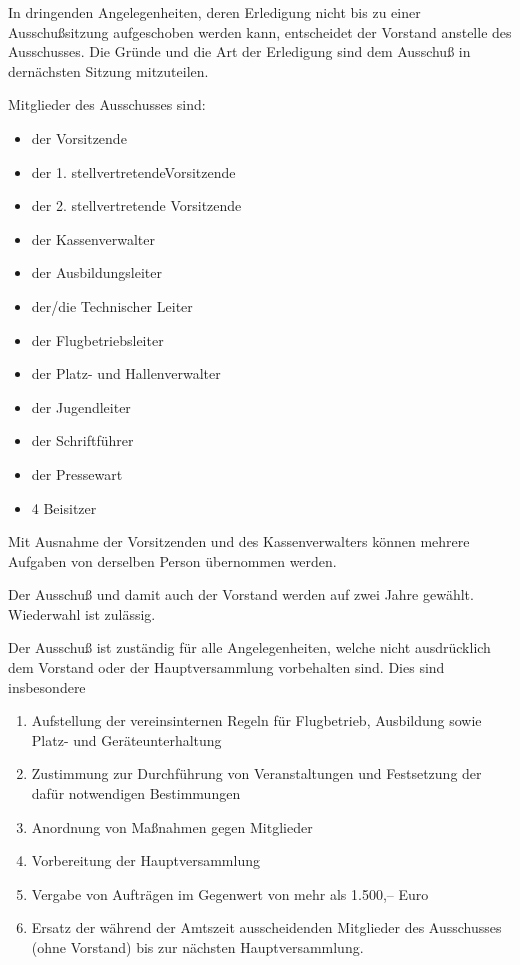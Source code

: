 \documentclass[10pt,a4paper,parskip=half]{scrartcl}
\begin{document}
\begin{contract}
\begin{multicols}{2}
    In dringenden Angelegenheiten,
    deren Erledigung nicht bis zu einer Ausschußsitzung aufgeschoben werden kann,
    entscheidet der Vorstand anstelle des Ausschusses.
    Die Gründe und die Art der Erledigung sind dem Ausschuß in dernächsten Sitzung mitzuteilen.
    
    Mitglieder des Ausschusses sind:
    \begin{itemize}[noitemsep]
      \item der Vorsitzende
      \item der 1. stellvertretendeVorsitzende
      \item der 2. stellvertretende Vorsitzende
      \item der Kassenverwalter
      \item der Ausbildungsleiter
      \item der/die Technischer Leiter
      \item der Flugbetriebsleiter
      \item der Platz- und Hallenverwalter
      \item der Jugendleiter
      \item der Schriftführer
      \item der Pressewart
      \item 4 Beisitzer
    \end{itemize}
    Mit Ausnahme der Vorsitzenden und des Kassenverwalters können mehrere Aufgaben von derselben Person übernommen werden.
    
    Der Ausschuß und damit auch der Vorstand werden auf zwei Jahre gewählt.
    Wiederwahl ist zulässig.
    
    Der Ausschuß ist zuständig für alle Angelegenheiten,
    welche nicht ausdrücklich dem Vorstand oder der Hauptversammlung vorbehalten sind.
    Dies sind insbesondere
    \begin{enumerate}[label=\alph*),noitemsep]
      \item Aufstellung der vereinsinternen Regeln für Flugbetrieb,
            Ausbildung sowie Platz- und Geräteunterhaltung
      \item Zustimmung zur Durchführung von Veranstaltungen und Festsetzung der dafür notwendigen Bestimmungen
      \item Anordnung von Maßnahmen gegen Mitglieder
      \item Vorbereitung der Hauptversammlung
      \item Vergabe von Aufträgen im Gegenwert von mehr als 1.500,-- Euro
      \item Ersatz der während der Amtszeit ausscheidenden Mitglieder des Ausschusses (ohne Vorstand) bis zur nächsten Hauptversammlung.
    \end{enumerate}
    

\end{multicols}
\end{contract}
\end{document}
